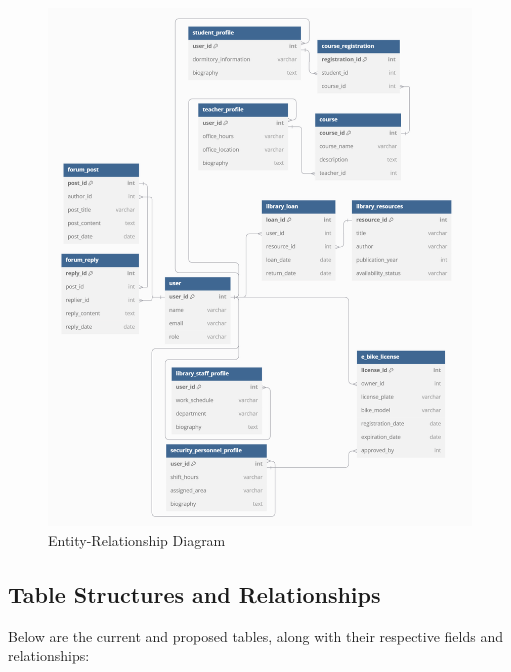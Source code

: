 \documentclass[12pt]{article}
\begin{document}
\begin{figure}[htbp]
  \centering
  \includegraphics[width=\textwidth, height=0.8\textheight, keepaspectratio]{ER.png}
  \caption{Entity-Relationship Diagram}
\end{figure}

\clearpage  %

\subsection{Table Structures and Relationships}
Below are the current and proposed tables, along with their respective fields and relationships:
\end{document}

